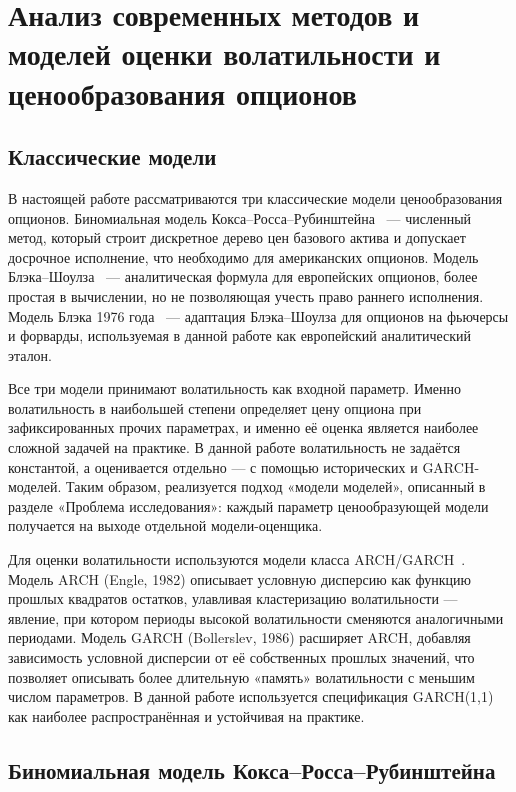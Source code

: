 \documentclass[11pt,a4paper]{article}
\begin{document}
\section{Анализ современных методов и моделей оценки волатильности и ценообразования опционов}

\subsection{Классические модели}

В настоящей работе рассматриваются три классические модели ценообразования опционов. Биномиальная модель Кокса--Росса--Рубинштейна~\cite{CRR} --- численный метод, который строит дискретное дерево цен базового актива и допускает досрочное исполнение, что необходимо для американских опционов. Модель Блэка--Шоулза~\cite{BlackScholes,Merton} --- аналитическая формула для европейских опционов, более простая в вычислении, но не позволяющая учесть право раннего исполнения. Модель Блэка 1976 года~\cite{Black} --- адаптация Блэка--Шоулза для опционов на фьючерсы и форварды, используемая в данной работе как европейский аналитический эталон.

Все три модели принимают волатильность как входной параметр. Именно волатильность в наибольшей степени определяет цену опциона при зафиксированных прочих параметрах, и именно её оценка является наиболее сложной задачей на практике. В данной работе волатильность не задаётся константой, а оценивается отдельно --- с помощью исторических и GARCH-моделей. Таким образом, реализуется подход «модели моделей», описанный в разделе «Проблема исследования»: каждый параметр ценообразующей модели получается на выходе отдельной модели-оценщика.

Для оценки волатильности используются модели класса ARCH/GARCH~\cite{Engle,Bollerslev}. Модель ARCH (Engle, 1982) описывает условную дисперсию как функцию прошлых квадратов остатков, улавливая кластеризацию волатильности --- явление, при котором периоды высокой волатильности сменяются аналогичными периодами. Модель GARCH (Bollerslev, 1986) расширяет ARCH, добавляя зависимость условной дисперсии от её собственных прошлых значений, что позволяет описывать более длительную «память» волатильности с меньшим числом параметров. В данной работе используется спецификация GARCH(1,1) как наиболее распространённая и устойчивая на практике.

\subsection{Биномиальная модель Кокса--Росса--Рубинштейна}
\end{document}
